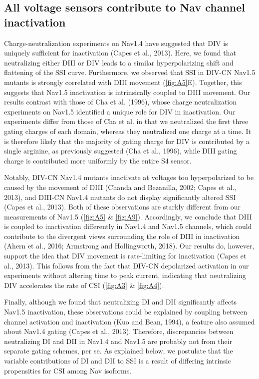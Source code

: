 \subsection{All voltage sensors contribute to Nav channel inactivation}
Charge-neutralization experiments on Nav1.4 have suggested that DIV is uniquely sufficient for inactivation (Capes et al., 2013). Here, we found that neutralizing either DIII or DIV leads to a similar hyperpolarizing shift and flattening of the SSI curve. Furthermore, we observed that SSI in DIV-CN Nav1.5 mutants is strongly correlated with DIII movement (\autoref{fig:A5}E). Together, this suggests that Nav1.5 inactivation is intrinsically coupled to DIII movement. Our results contrast with those of Cha et al. (1996), whose charge neutralization experiments on Nav1.5 identified a unique role for DIV in inactivation. Our experiments differ from those of Cha et al. in that we neutralized the first three gating charges of each domain, whereas they neutralized one charge at a time. It is therefore likely that the majority of gating charge for DIV is contributed by a single arginine, as previously suggested (Cha et al., 1996), while DIII gating charge is contributed more uniformly by the entire S4 sensor. 

Notably, DIV-CN Nav1.4 mutants inactivate at voltages too hyperpolarized to be caused by the movement of DIII (Chanda and Bezanilla, 2002; Capes et al., 2013), and DIII-CN Nav1.4 mutants do not display significantly altered SSI (Capes et al., 2013). Both of these observations are starkly different from our measurements of Nav1.5 (\autoref{fig:A5} \& \ref{fig:A9}). Accordingly, we conclude that DIII is coupled to inactivation differently in Nav1.4 and Nav1.5 channels, which could contribute to the divergent views surrounding the role of DIII in inactivation (Ahern et al., 2016; Armstrong and Hollingworth, 2018). Our results do, however, support the idea that DIV movement is rate-limiting for inactivation (Capes et al., 2013). This follows from the fact that DIV-CN depolarized activation in our experiments without altering time to peak current, indicating that neutralizing DIV accelerates the rate of CSI (\autoref{fig:A3} \& \ref{fig:A4}).

Finally, although we found that neutralizing DI and DII significantly affects Nav1.5 inactivation, these observations could be explained by coupling between channel activation and inactivation (Kuo and Bean, 1994), a feature also assumed about Nav1.4 gating (Capes et al., 2013). Therefore, discrepancies between neutralizing DI and DII in Nav1.4 and Nav1.5 are probably not from their separate gating schemes, per se. As explained below, we postulate that the variable contributions of DI and DII to SSI is a result of differing intrinsic propensities for CSI among Nav isoforms.


